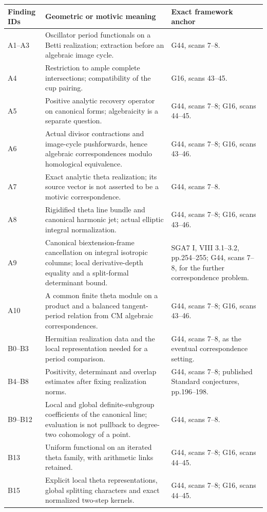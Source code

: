 \documentclass[11pt]{article}
\theoremstyle{definition}\newtheorem{definition}[theorem]{Definition}\newtheorem{remark}[theorem]{Remark}
\begin{document}
\begin{longtable}{@{}p{.18\linewidth}p{.48\linewidth}p{.27\linewidth}@{}}
\toprule Finding IDs & Geometric or motivic meaning & Exact framework anchor\\\midrule\endhead
A1--A3 & Oscillator period functionals on a Betti realization; extraction before an algebraic image cycle. & G44, scans 7--8.\\
A4 & Restriction to ample complete intersections; compatibility of the cup pairing. & G16, scans 43--45.\\
A5 & Positive analytic recovery operator on canonical forms; algebraicity is a separate question. & G44, scans 7--8; G16, scans 44--45.\\
A6 & Actual divisor contractions and image-cycle pushforwards, hence algebraic correspondences modulo homological equivalence. & G44, scans 7--8; G16, scans 43--46.\\
A7 & Exact analytic theta realization; its source vector is not asserted to be a motivic correspondence. & G44, scans 7--8.\\
A8 & Rigidified theta line bundle and canonical harmonic jet; actual elliptic integral normalization. & G44, scans 7--8; G16, scans 43--46.\\
A9 & Canonical biextension-frame cancellation on integral isotropic columns; local derivative-depth equality and a split-formal determinant bound. & SGA7 I, VIII 3.1--3.2, pp.254--255; G44, scans 7--8, for the further correspondence problem.\\
A10 & A common finite theta module on a product and a balanced tangent-period relation from CM algebraic correspondences. & G44, scans 7--8; G16, scans 43--46.\\
B0--B3 & Hermitian realization data and the local representation needed for a period comparison. & G44, scans 7--8, as the eventual correspondence setting.\\
B4--B8 & Positivity, determinant and overlap estimates after fixing realization norms. & G44, scans 7--8; published Standard conjectures, pp.196--198.\\
B9--B12 & Local and global definite-subgroup coefficients of the canonical line; evaluation is not pullback to degree-two cohomology of a point. & G44, scans 7--8.\\
B13 & Uniform functional on an iterated theta family, with arithmetic links retained. & G44, scans 7--8; G16, scans 44--45.\\
B15 & Explicit local theta representations, global splitting characters and exact normalized two-step kernels. & G44, scans 7--8; G16, scans 44--45.\\

\end{longtable}
\end{document}
